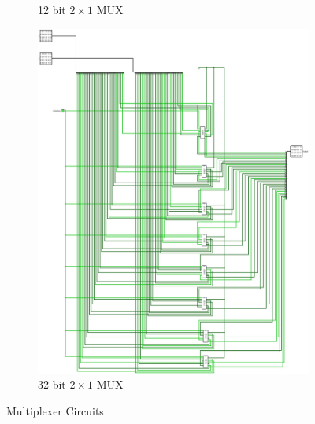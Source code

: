 \documentclass[12pt]{article}
\begin{document}
\begin{figure}[H]
\begin{subfigure}[b]{0.3\textwidth}
        \caption{12 bit $2\times1$ MUX}
        \label{fig:12b2x1mux}
    \end{subfigure}
     \newline
     \newline
    \begin{subfigure}[b]{0.4\textwidth}
        \includegraphics[width=\textwidth]{images/MUX_32_bit.jpg}
        \caption{32 bit $2\times1$ MUX}
        \label{fig:32b2x1}
    \end{subfigure}

    \caption{Multiplexer Circuits}\label{fig:mux}
\end{figure}

\newpage
\end{document}
